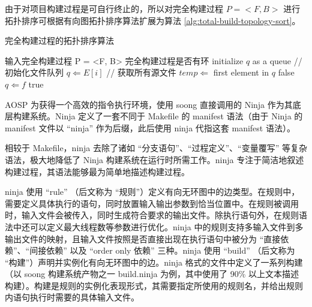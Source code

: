 由于对项目构建过程是可自行终止的，所以对完全构建过程 $P = <F, B>$ 进行拓扑排序可根据有向图拓扑排序算法扩展为算法 \ref{alg:total-build-topology-sort}。

\vskip 13.8pt
\renewcommand{\thealgorithm}{3}
    \begin{algorithm}
        \caption{完全构建过程的拓扑排序算法}
        \begin{algorithmic}[1]
            \Require 输入完全构建过程 P = <F, B>
            \Ensure 完全构建过程是否有环
            \State initialize $q$ as a queue // 初始化文件队列
                    \State $q \Leftarrow E[i]$ // 获取所有源文件
                \EndIf
            \EndFor
                \State $temp \Leftarrow$ first element in $q$
                            \State \Return false
                        \EndIf
                        \State $q \Leftarrow f$
                    \EndFor
                \EndFor
            \EndWhile
            \State \Return true
        \end{algorithmic}
        \label{alg:total-build-topology-sort}
    \end{algorithm}
    \vskip 13.8pt

AOSP 为获得一个高效的指令执行环境，使用 soong 直接调用的 Ninja 作为其底层构建系统。Ninja 定义了一套不同于 Makefile 的 manifest 语法（由于 Ninja 的 manifest 文件以 “ninja” 作为后缀，此后使用 ninja 代指这套 manifest 语法）。

相较于 Makefile，ninja 去除了诸如 “分支语句”、“过程定义”、“变量覆写” 等复杂语法，极大地降低了 Ninja 构建系统在运行时所需工作。ninja 专注于简洁地叙述构建过程，其语法能够最为简单地描述构建过程。

ninja 使用 “rule” （后文称为 “规则”）定义有向无环图中的边类型。在规则中，需要定义具体执行的语句，同时放置输入输出参数到恰当位置中。在规则被调用时，输入文件会被传入，同时生成符合要求的输出文件。除执行语句外，在规则语法中还可以定义最大线程数等参数进行优化。ninja 中的规则支持多输入文件到多输出文件的映射，且输入文件按照是否直接出现在执行语句中被分为 “直接依赖”、“间接依赖” 以及 “order only 依赖” 三种。ninja 使用 “build” （后文称为 “构建”）声明并实例化有向无环图中的边。ninja 格式的文件中定义了一系列构建（以 soong 构建系统产物之一 build.ninja 为例，其中使用了 90\% 以上文本描述构建）。构建是规则的实例化表现形式，其需要指定所使用的规则名，并给出规则内语句执行时需要的具体输入文件。

